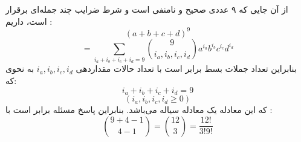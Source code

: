 \p
از آن جایی که ۹ عددی صحیح و نا‌منفی است و شرط 
 ضرایب چند جمله‌ای برقرار است، داریم :
  $$(a + b + c + d)^9$$
  $$= \sum\limits_{i_a+i_b+i_c+i_d=9} \binom{9}{i_a,i_b,i_c,i_d} a^{i_a} b^{i_b} c^{i_c} d^{i_d}$$
بنابراین تعداد جملات بسط برابر است با تعداد حالات مقداردهی
$i_a,i_b,i_c,i_d$
به نحوی که:
  $$i_a+i_b+i_c+i_d=9$$
  $$(i_a,i_b,i_c,i_d \geq 0)$$
که این معادله یک معادله سیاله می‌باشد. بنابراین پاسخ مسئله برابر است با :
  $$\binom{9 + 4 - 1}{4 - 1} = \binom{12}{3} = \frac{12!}{3!9!}$$